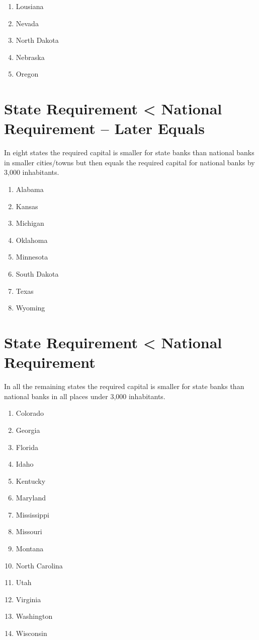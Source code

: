 ﻿\documentclass[12pt]{report}
\begin{document}
\begin{enumerate}
\item Lousiana
\item Nevada
\item North Dakota
\item Nebraska
\item Oregon
\end{enumerate}

\section{State Requirement < National Requirement -- Later Equals}
In eight states the required capital is smaller for state banks than national banks in smaller cities/towns but then equals the required capital for national banks by 3,000 inhabitants.

\begin{enumerate}
\item Alabama
\item Kansas
\item Michigan
\item Oklahoma
\item Minnesota
\item South Dakota
\item Texas
\item Wyoming
\end{enumerate}

\section{State Requirement < National Requirement}
In all the remaining states the required capital is smaller for state banks than national banks in all places under 3,000 inhabitants.

\begin{enumerate}
\item Colorado
\item Georgia
\item Florida
\item Idaho
\item Kentucky
\item Maryland
\item Mississippi
\item Missouri
\item Montana
\item North Carolina
\item Utah
\item Virginia
\item Washington
\item Wisconsin
\end{enumerate}
\end{document}
